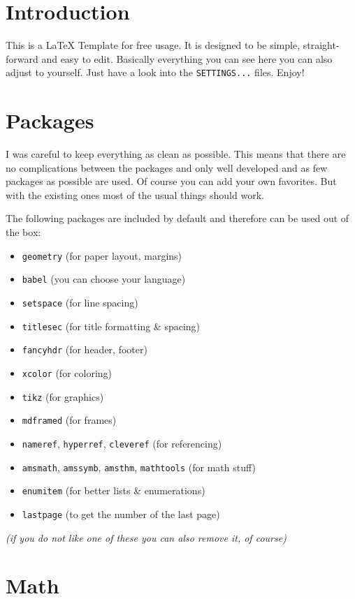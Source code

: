 \documentclass[11pt, a4paper]{article}
\begin{document}
\section{Introduction}

This is a \LaTeX{} Template for free usage. It is designed to be simple, straight-forward and easy to edit.
Basically everything you can see here you can also adjust to yourself. Just have a look into the \texttt{SETTINGS...} files. Enjoy!

\section{Packages}

I was careful to keep everything as clean as possible. This means that there are
no complications between the packages and only well developed and as few
packages as possible are used. Of course you can add your own favorites. But
with the existing ones most of the usual things should work.

The following packages are included by default and therefore can be used out of
the box:

\begin{itemize}
\item \texttt{geometry} (for paper layout, margins)
\item \texttt{babel} (you can choose your language)
\item \texttt{setspace} (for line spacing)
\item \texttt{titlesec} (for title formatting \& spacing)
\item \texttt{fancyhdr} (for header, footer)
\item \texttt{xcolor} (for coloring)
\item \texttt{tikz} (for graphics)
\item \texttt{mdframed} (for frames)
\item \texttt{nameref}, \texttt{hyperref}, \texttt{cleveref} (for referencing)
\item \texttt{amsmath}, \texttt{amssymb}, \texttt{amsthm}, \texttt{mathtools}
  (for math stuff)
\item \texttt{enumitem} (for better lists \& enumerations)
\item \texttt{lastpage} (to get the number of the last page)
\end{itemize}

\textsl{(if you do not like one of these you can also remove it, of course)}

\section{Math}
\end{document}
